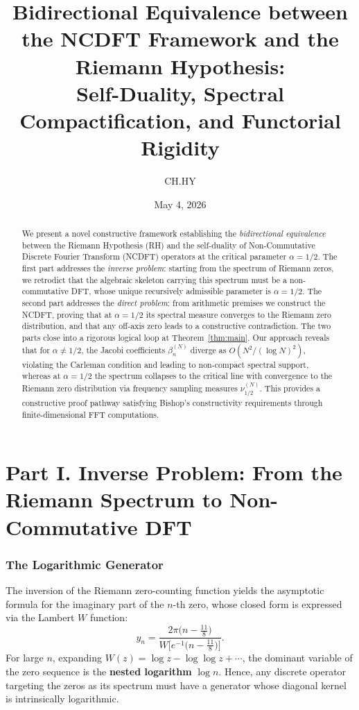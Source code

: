 \documentclass[12pt,a4paper]{amsart}
\title[Bidirectional Equivalence via NCDFT]{%
Bidirectional Equivalence between the NCDFT Framework and the Riemann Hypothesis:\\
Self-Duality, Spectral Compactification, and Functorial Rigidity}
\author{CH.HY}
\date{May 4, 2026}
\theoremstyle{plain}
\theoremstyle{definition}
\theoremstyle{remark}
\begin{document}
\begin{abstract}
We present a novel constructive framework establishing the \emph{bidirectional equivalence} between the Riemann Hypothesis (RH) and the self-duality of Non-Commutative Discrete Fourier Transform (NCDFT) operators at the critical parameter $\alpha=1/2$. The first part addresses the \emph{inverse problem}: starting from the spectrum of Riemann zeros, we retrodict that the algebraic skeleton carrying this spectrum must be a non-commutative DFT, whose unique recursively admissible parameter is $\alpha=1/2$. The second part addresses the \emph{direct problem}: from arithmetic premises we construct the NCDFT, proving that at $\alpha=1/2$ its spectral measure converges to the Riemann zero distribution, and that any off-axis zero leads to a constructive contradiction. The two parts close into a rigorous logical loop at Theorem~\ref{thm:main}. Our approach reveals that for $\alpha\neq1/2$, the Jacobi coefficients $\beta_n^{(N)}$ diverge as $O(N^2/(\log N)^2)$, violating the Carleman condition and leading to non-compact spectral support, whereas at $\alpha=1/2$ the spectrum collapses to the critical line with convergence to the Riemann zero distribution via frequency sampling measures $\nu_{1/2}^{(N)}$. This provides a constructive proof pathway satisfying Bishop's constructivity requirements through finite-dimensional FFT computations.
\end{abstract}

\maketitle

\part*{Part I. Inverse Problem: From the Riemann Spectrum to Non-Commutative DFT}

\section{The Logarithmic Generator}

The inversion of the Riemann zero-counting function yields the asymptotic formula for the imaginary part of the $n$-th zero, whose closed form is expressed via the Lambert $W$ function:
\[
y_n=\frac{2\pi\bigl(n-\frac{11}{8}\bigr)}{W\!\bigl[e^{-1}\bigl(n-\frac{11}{8}\bigr)\bigr]}.
\]
For large $n$, expanding $W(z)=\log z-\log\log z+\cdots$, the dominant variable of the zero sequence is the \textbf{nested logarithm} $\log n$. Hence, any discrete operator targeting the zeros as its spectrum must have a generator whose diagonal kernel is intrinsically logarithmic.
\end{document}
